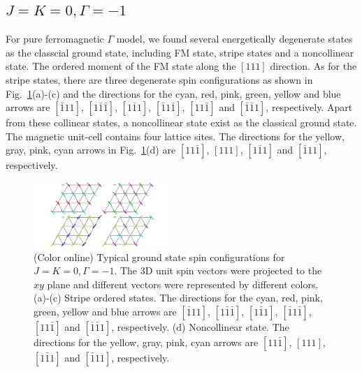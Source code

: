 \documentclass[aps,prb,reprint,amsfonts,amsmath,amssymb,showpacs,groupedaddress,superscriptaddress]{revtex4-1}
\begin{document}
\subsection{$J=K=0, \Gamma=-1$}
For pure ferromagnetic $\Gamma$ model, we found several energetically degenerate states as the classcial ground state, including FM state, stripe states and a noncollinear state. The ordered moment of the FM state along the $[111]$ direction. As for the stripe states, there are three degenerate spin configurations as shown in Fig.~\ref{fig:GSForNegativeGamma}(a)-(c) and the directions for the cyan, red, pink, green, yellow and blue arrows are $[\bar{1}11]$, $[1\bar{1}\bar{1}]$, $[1\bar{1}1]$, $[\bar{1}1\bar{1}]$, $[11\bar{1}]$ and $[\bar{1}\bar{1}1]$, respectively. Apart from these collinear states, a noncollinear state exist as the classical ground state. The magnetic unit-cell contains four lattice sites. The directions for the yellow, gray, pink, cyan arrows in Fig.~\ref{fig:GSForNegativeGamma}(d) are $[11\bar{1}]$, $[111]$, $[1\bar{1}1]$ and $[\bar{1}11]$, respectively.
\begin{figure}
    \includegraphics[width=0.45\textwidth]{FigA2.pdf}
    \caption{\label{fig:GSForNegativeGamma}(Color online) Typical ground state spin configurations for $J=K=0, \Gamma=-1$. The 3D unit spin vectors were projected to the $xy$ plane and different vectors were represented by different colors. (a)-(c) Stripe ordered states. The directions for the cyan, red, pink, green, yellow and blue arrows are $[\bar{1}11]$, $[1\bar{1}\bar{1}]$, $[1\bar{1}1]$, $[\bar{1}1\bar{1}]$, $[11\bar{1}]$ and $[\bar{1}\bar{1}1]$, respectively. (d) Noncollinear state. The directions for the yellow, gray, pink, cyan arrows are $[11\bar{1}]$, $[111]$, $[1\bar{1}1]$ and $[\bar{1}11]$, respectively.}
\end{figure}
\end{document}
